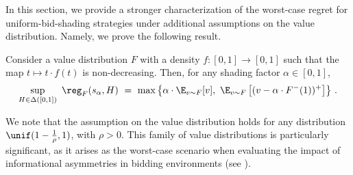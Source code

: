 In this section, we provide a stronger characterization of the worst-case regret for uniform-bid-shading strategies under additional assumptions on the value distribution. Namely, we prove the following result.
\begin{proposition}\label{prop:uniform-bid-shading}
	Consider a value distribution $F$ with a density $f:[0,1] \to [0,1]$ such that the map $t \mapsto t\cdot f(t)$ is non-decreasing. Then, for any shading factor $\alpha \in [0,1]$,
	\begin{align*}
		\sup_{H \in \Delta([0,1])}\ \reg_F(s_\alpha, H)\ =\ \max\left\{\alpha \cdot \E_{v \sim F}[v],\ \E_{v\sim F}\left[(v - \alpha \cdot F^-(1))^+ \right]\right\}\,.
	\end{align*}
\end{proposition}
We note that the assumption on the value distribution holds for any distribution $\unif(1 - \tfrac{1}{\rho}, 1)$, with $\rho >0$. This family of value distributions is particularly significant, as it arises as the worst-case scenario when evaluating the impact of informational asymmetries in bidding environments (see ).



